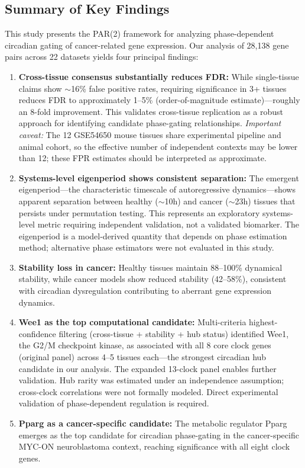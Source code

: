 \documentclass[11pt,a4paper]{article}
\begin{document}
\subsection{Summary of Key Findings}

This study presents the PAR(2) framework for analyzing phase-dependent circadian gating of cancer-related gene expression. Our analysis of 28,138 gene pairs across 22 datasets yields four principal findings:

\begin{enumerate}
    \item \textbf{Cross-tissue consensus substantially reduces FDR:} While single-tissue claims show $\sim$16\% false positive rates, requiring significance in 3+ tissues reduces FDR to approximately 1--5\% (order-of-magnitude estimate)---roughly an 8-fold improvement. This validates cross-tissue replication as a robust approach for identifying candidate phase-gating relationships. \textit{Important caveat:} The 12 GSE54650 mouse tissues share experimental pipeline and animal cohort, so the effective number of independent contexts may be lower than 12; these FPR estimates should be interpreted as approximate.
    
    \item \textbf{Systems-level eigenperiod shows consistent separation:} The emergent eigenperiod---the characteristic timescale of autoregressive dynamics---shows apparent separation between healthy ($\sim$10h) and cancer ($\sim$23h) tissues that persists under permutation testing. This represents an exploratory systems-level metric requiring independent validation, not a validated biomarker. The eigenperiod is a model-derived quantity that depends on phase estimation method; alternative phase estimators were not evaluated in this study.
    
    \item \textbf{Stability loss in cancer:} Healthy tissues maintain 88--100\% dynamical stability, while cancer models show reduced stability (42--58\%), consistent with circadian dysregulation contributing to aberrant gene expression dynamics.
    
    \item \textbf{Wee1 as the top computational candidate:} Multi-criteria highest-confidence filtering (cross-tissue + stability + hub status) identified Wee1, the G2/M checkpoint kinase, as associated with all 8 core clock genes (original panel) across 4--5 tissues each---the strongest circadian hub candidate in our analysis. The expanded 13-clock panel enables further validation. Hub rarity was estimated under an independence assumption; cross-clock correlations were not formally modeled. Direct experimental validation of phase-dependent regulation is required.
    
    \item \textbf{Pparg as a cancer-specific candidate:} The metabolic regulator Pparg emerges as the top candidate for circadian phase-gating in the cancer-specific MYC-ON neuroblastoma context, reaching significance with all eight clock genes.
\end{enumerate}
\end{document}
